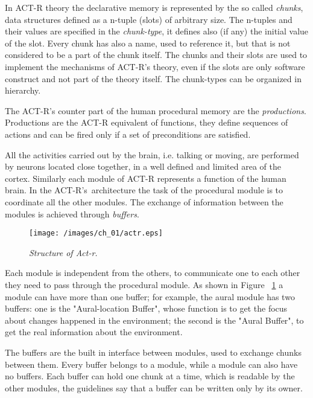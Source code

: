 	In \mbox{ACT-R} theory the declarative memory is represented by the so called \emph{chunks}, data structures defined as a n-tuple (slots) of arbitrary size. The n-tuples and their values are specified in the \emph{chunk-type}, it defines also (if any) the initial value of the slot. Every chunk has also a name, used to reference it, but that is not considered to be a part of the chunk itself. The chunks and their slots are used to implement the mechanisms of \mbox{ACT-R's} theory, even if the slots are only software construct and not part of the theory itself. The chunk-types can be organized in hierarchy.

	The \mbox{ACT-R's} counter part of the human procedural memory are the \emph{productions}. Productions are the \mbox{ACT-R} equivalent of functions, they define sequences of actions and can be fired only if a set of preconditions are satisfied.  

	All the activities carried out by the brain, i.e. talking or moving, are performed by neurons located close together, in a well defined and limited area of the cortex. Similarly each module of \mbox{ACT-R} represents a function of the human brain. In the \mbox{ACT-R's architecture} the task of the procedural module is to coordinate all the other modules. The exchange of information between the modules is achieved through \emph{buffers}.

	\begin{figure}[h]
	\begin{center} 
	\texttt{[image: /images/ch\_01/actr.eps]}
	\end{center} 
	\caption{\textit{Structure of Act-r.}}  
	\label{fig:modulesActr}
	\end{figure}
	
	Each module is independent from the others, to communicate one to each other they need to pass through the procedural module. As shown in Figure  ~\ref{fig:modulesActr} a module can have more than one buffer; for example, the aural module has two buffers: one is the "Aural-location Buffer", whose function is to get the focus about changes happened in the environment; the second is the "Aural Buffer", to get the real information about the environment.

	The buffers are the built in interface between modules, used to exchange chunks between them. Every buffer belongs to a module, while a module can also have no buffers. Each buffer can hold one chunk at a time, which is readable by the other modules, the guidelines say that a buffer can be written only by its owner. 

